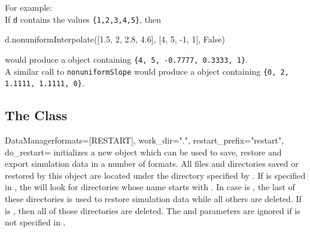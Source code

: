 \noindent For example:\\
If \texttt{d} contains the values \texttt{\{1,2,3,4,5\}}, then
\begin{python}
d.nonuniformInterpolate([1.5, 2, 2.8, 4.6], [4, 5, -1, 1], False)
\end{python}
would produce a \Data object containing \texttt{\{4, 5, -0.7777, 0.3333, 1\}}.\\
A similar call to \texttt{nonuniformSlope} would produce a \Data object containing \texttt{\{0, 2, 1.1111, 1.1111, 0\}}.
% 
% 
% 
% 
% 
% 

\subsection{The  Class}
\label{sec:datamanager}

\begin{classdesc}{DataManager}{formats=[RESTART], work_dir=".", restart_prefix="restart", do_restart=\True}
    initializes a new  object which can be used to save,
    restore and export simulation data in a number of formats.
    All files and directories saved or restored by this object are located
    under the directory specified by .
    If  is specified in , the  will
    look for directories whose name starts with .
    In case  is \True, the last of these directories is used
    to restore simulation data while all others are deleted.
    If  is \False, then all of those directories are deleted.
    The  and  parameters are ignored if
     is not specified in .
\end{classdesc}

